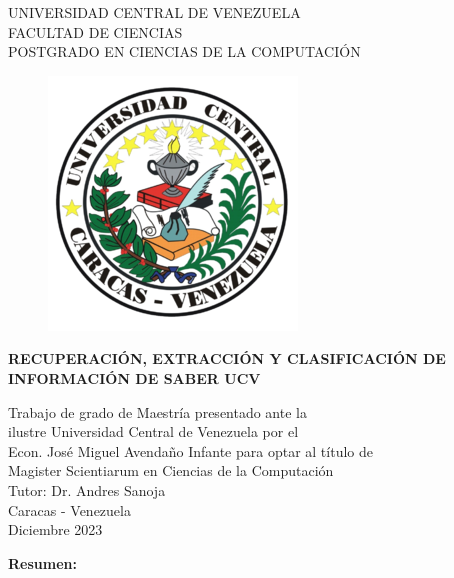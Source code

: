 \thispagestyle{empty}
\begin{center}
	UNIVERSIDAD CENTRAL DE VENEZUELA\\
	FACULTAD DE CIENCIAS\\
	POSTGRADO EN CIENCIAS DE LA COMPUTACI\'ON\\

	\begin{figure}
						\centering
						  \includegraphics[height=.7\textwidth]{images/UCV.png}
  \end{figure}
  \vspace{1.5cm}
  \large{\textbf{RECUPERACI\'ON, EXTRACCI\'ON Y CLASIFICACI\'ON DE \\ INFORMACI\'ON DE SABER UCV}}

  \vspace{3cm}
  Trabajo de grado de Maestría presentado ante la \\
  ilustre Universidad Central de Venezuela por el\\
  Econ. José Miguel Avendaño Infante para  optar
  al título de \\Magister Scientiarum en Ciencias de la Computaci\'on\\
  \vspace{0.5cm}
  Tutor: Dr. Andres Sanoja\\
  \vspace{1.5cm}
  Caracas - Venezuela\\
  Diciembre 2023
\end{center}


\newpage
\thispagestyle{empty}
\large{\textbf{Resumen:}}

